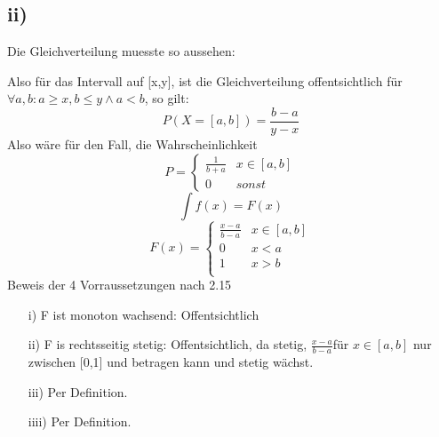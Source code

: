 \documentclass[]{article}
\begin{document}
 \subsection{ii)} Die Gleichverteilung muesste so aussehen: 
 

 Also f\"ur das Intervall auf [x,y], ist die Gleichverteilung offentsichtlich f\"ur  $ \forall a,b : a \geq x , b \leq y  \land a < b $, so gilt: 
 $$ 
 P (X = [a,b] ) = \frac{b-a}{y-x}
 $$
  Also wäre für  den Fall, die Wahrscheinlichkeit $$ P = \begin{cases}
  \frac{1}{b+a}  & x \in [a,b]  \\
   0 & sonst 
  \end{cases} 
  $$
  $$
  \int f(x) = F(x)   $$ $$ 
  F(x) =  \begin{cases}  \frac{x-a}{b-a} & x \in [a,b]\\ 
  							 0 &  x < a \\
  							 1& x> b \\
  		\end{cases} 
  $$
  Beweis der 4 Vorraussetzungen nach 2.15 
  
  
  
  \begin{itemize}
  	\item[i)] 	F ist monoton wachsend: Offentsichtlich
  	\item[ii)] F is rechtsseitig stetig: Offentsichtlich, da
  	stetig, $\frac{x-a}{b-a} $für $ x \in [a,b]  $ nur zwischen [0,1] und betragen kann und stetig w\"achst.
  	\item[iii)] Per Definition.
  	\item[iiii)] Per Definition.
  \end{itemize}
\end{document}
